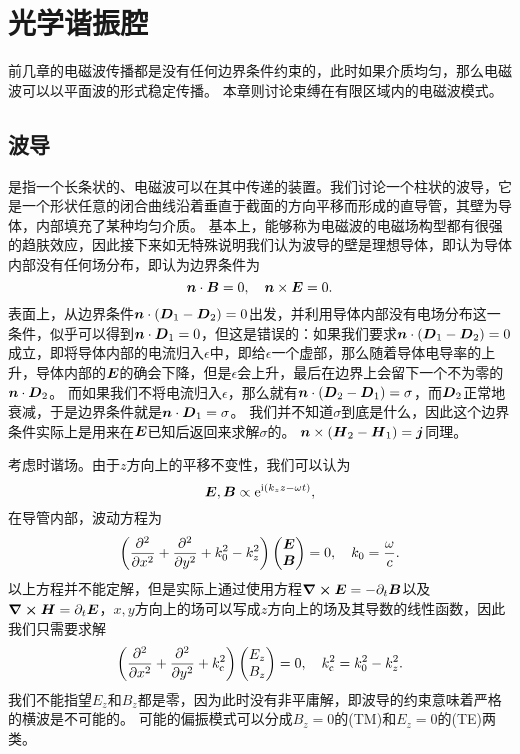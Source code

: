 \chapter{光学谐振腔}

前几章的电磁波传播都是没有任何边界条件约束的，此时如果介质均匀，那么电磁波可以以平面波的形式稳定传播。
本章则讨论束缚在有限区域内的电磁波模式。

\section{波导}

是指一个长条状的、电磁波可以在其中传递的装置。我们讨论一个柱状的波导，它是一个形状任意的闭合曲线沿着垂直于截面的方向平移而形成的直导管，其壁为导体，内部填充了某种均匀介质。
基本上，能够称为电磁波的电磁场构型都有很强的趋肤效应，因此接下来如无特殊说明我们认为波导的壁是理想导体，即认为导体内部没有任何场分布，即认为边界条件为
\begin{equation}
    \vb*{n} \cdot \vb*{B} = 0, \quad \vb*{n} \times \vb*{E} = 0.
\end{equation}
表面上，从边界条件$\vb*{n} \cdot (\vb*{D}_1 - \vb*{D}_2) = 0$出发，并利用导体内部没有电场分布这一条件，似乎可以得到$\vb*{n} \cdot \vb*{D}_1=0$，但这是错误的：如果我们要求$\vb*{n} \cdot (\vb*{D}_1 - \vb*{D}_2) = 0$成立，即将导体内部的电流归入$\epsilon$中，即给$\epsilon$一个虚部，那么随着导体电导率的上升，导体内部的$\vb*{E}$的确会下降，但是$\epsilon$会上升，最后在边界上会留下一个不为零的$\vb*{n} \cdot \vb*{D}_2$。
而如果我们不将电流归入$\epsilon$，那么就有$\vb*{n} \cdot (\vb*{D}_2 - \vb*{D}_1) = \sigma$，而$\vb*{D}_2$正常地衰减，于是边界条件就是$\vb*{n} \cdot \vb*{D}_1 = \sigma$。
我们并不知道$\sigma$到底是什么，因此这个边界条件实际上是用来在$\vb*{E}$已知后返回来求解$\sigma$的。
$\vb*{n} \times (\vb*{H}_2 - \vb*{H}_1) = \vb*{j}$同理。

考虑时谐场。由于$z$方向上的平移不变性，我们可以认为
\[
    \vb*{E}, \vb*{B} \propto \mathrm{e}^{\mathrm{i} (k_z z - \omega t)},
\]
在导管内部，波动方程为
\begin{equation}
    \left( \pdv[2]{x} + \pdv[2]{y} + k_0^2 - k_z^2 \right) \pmqty{\vb*{E} \\ \vb*{B}} = 0, \quad k_0 = \frac{\omega}{c}.
\end{equation}
以上方程并不能定解，但是实际上通过使用方程$\curl{\vb*{E}}=-\partial_t \vb*{B}$以及$\curl{\vb*{H}} = \partial_t \vb*{E}$，$x, y$方向上的场可以写成$z$方向上的场及其导数的线性函数，因此我们只需要求解
\begin{equation}
    \left( \pdv[2]{x} + \pdv[2]{y} + k_\text{c}^2 \right) \pmqty{E_z \\ B_z} = 0, \quad k_\text{c}^2 = k_0^2 - k_z^2.
\end{equation}
我们不能指望$E_z$和$B_z$都是零，因为此时没有非平庸解，即波导的约束意味着严格的横波是不可能的。
可能的偏振模式可以分成$B_z=0$的(TM)和$E_z=0$的(TE)两类。

